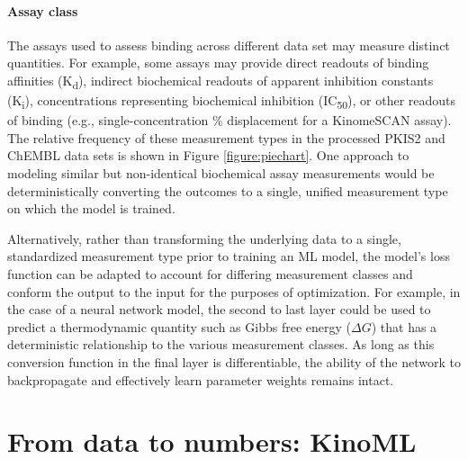 \documentclass[9pt,lessons]{livecoms}
\begin{document}
\paragraph{Assay class}

The assays used to assess binding across different data set may measure distinct quantities. For example, some assays may provide direct readouts of binding affinities (K\textsubscript{d}), indirect biochemical readouts of apparent inhibition constants (K\textsubscript{i}), concentrations representing biochemical inhibition (IC\textsubscript{50}), or other readouts of binding (e.g., single-concentration \% displacement for a KinomeSCAN assay). The relative frequency of these measurement types in the processed PKIS2 and ChEMBL data sets is shown in Figure \ref{figure:piechart}. One approach to modeling similar but non-identical biochemical assay measurements would be deterministically converting the outcomes to a single, unified measurement type on which the model is trained.

Alternatively, rather than transforming the underlying data to a single, standardized measurement type prior to training an ML model, the model's loss function can be adapted to account for differing measurement classes and conform the output to the input for the purposes of optimization. For example, in the case of a neural network model, the second to last layer could be used to predict a thermodynamic quantity such as Gibbs free energy ($\Delta G$) that has a deterministic relationship to the various measurement classes. As long as this conversion function in the final layer is differentiable, the ability of the network to backpropagate and effectively learn parameter weights remains intact.



\section{From data to numbers: KinoML}
\end{document}
